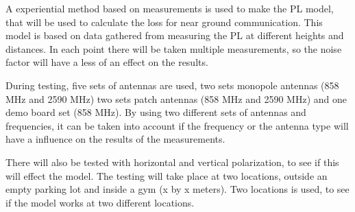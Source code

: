 A experiential method based on measurements is used to make the PL model, that will be used to calculate the loss for near ground communication. This model is based on data gathered from measuring the PL at different heights and distances. In each point there will be taken multiple measurements, so the noise factor will have a less of an effect on the results.

During testing, five sets of antennas are used, two sets monopole antennas (858 MHz and 2590 MHz) two sets patch antennas (858 MHz and 2590 MHz) and one demo board set (858 MHz). By using two different sets of antennas and frequencies, it can be taken into account if the frequency or the antenna type will have a influence on the results of the measurements. 

There will also be tested with horizontal and vertical polarization, to see if this will effect the model. The testing will take place at two locations, outside an empty parking lot and inside a gym (x by x meters). Two locations is used, to see if the model works at two different locations.